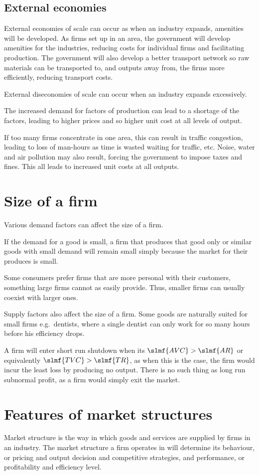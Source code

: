 \documentclass[Economics.tex]{subfiles}
\begin{document}
\subsection{External economies}
External economies of scale can occur as when an industry expands, amenities will be developed. As firms set up in an area, the government will develop amenities for the industries, reducing costs for individual firms and facilitating production. The government will also develop a better transport network so raw materials can be transported to, and outputs away from, the firms more efficiently, reducing transport costs.

External diseconomies of scale can occur when an industry expands excessively.

The increased demand for factors of production can lead to a shortage of the factors, leading to higher prices and so higher unit cost at all levels of output.

If too many firms concentrate in one area, this can result in traffic congestion, leading to loss of man-hours as time is wasted waiting for traffic, etc. Noise, water and air pollution may also result, forcing the government to impose taxes and fines. This all leads to increased unit costs at all outputs.
\section{Size of a firm}
Various demand factors can affect the size of a firm.

If the demand for a good is small, a firm that produces that good only or similar goods with small demand will remain small simply because the market for their produces is small.

Some consumers prefer firms that are more personal with their customers, something large firms cannot as easily provide. Thus, smaller firms can usually coexist with larger ones.

Supply factors also affect the size of a firm. Some goods are naturally suited for small firms e.g.\ dentists, where a single dentist can only work for so many hours before his efficiency drops.

A firm will enter short run shutdown when its \(\slmf{AVC} > \slmf{AR}\) or equivalently \(\slmf{TVC} > \slmf{TR}\), as when this is the case, the firm would incur the least loss by producing no output. There is no such thing as long run subnormal profit, as a firm would simply exit the market.
\section{Features of market structures}
Market structure is the way in which goods and services are supplied by firms in an industry. The market structure a firm operates in will determine its behaviour, or pricing and output decision and competitive strategies, and performance, or profitability and efficiency level.
\end{document}
